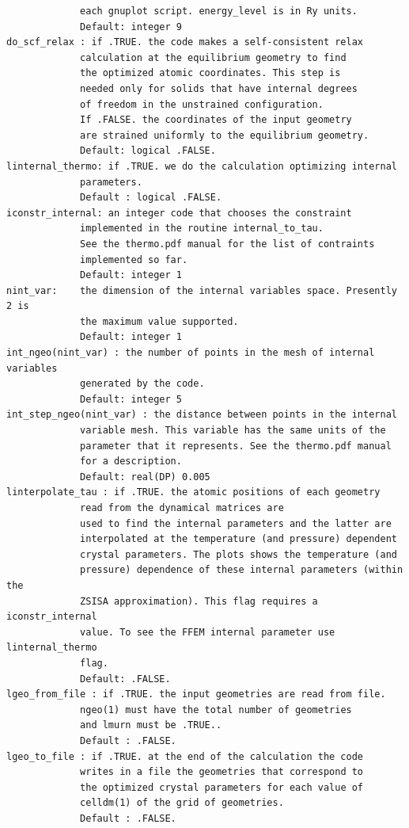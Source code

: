 \documentclass[12pt,a4paper,twoside]{report}
\begin{document}
\begin{verbatim}
             each gnuplot script. energy_level is in Ry units.
             Default: integer 9
do_scf_relax : if .TRUE. the code makes a self-consistent relax 
             calculation at the equilibrium geometry to find 
             the optimized atomic coordinates. This step is 
             needed only for solids that have internal degrees 
             of freedom in the unstrained configuration. 
             If .FALSE. the coordinates of the input geometry 
             are strained uniformly to the equilibrium geometry.
             Default: logical .FALSE. 
linternal_thermo: if .TRUE. we do the calculation optimizing internal
             parameters. 
             Default : logical .FALSE.
iconstr_internal: an integer code that chooses the constraint 
             implemented in the routine internal_to_tau.
             See the thermo.pdf manual for the list of contraints 
             implemented so far.
             Default: integer 1
nint_var:    the dimension of the internal variables space. Presently 2 is
             the maximum value supported.
             Default: integer 1
int_ngeo(nint_var) : the number of points in the mesh of internal variables
             generated by the code.
             Default: integer 5
int_step_ngeo(nint_var) : the distance between points in the internal
             variable mesh. This variable has the same units of the
             parameter that it represents. See the thermo.pdf manual
             for a description.
             Default: real(DP) 0.005
linterpolate_tau : if .TRUE. the atomic positions of each geometry
             read from the dynamical matrices are
             used to find the internal parameters and the latter are
             interpolated at the temperature (and pressure) dependent
             crystal parameters. The plots shows the temperature (and
             pressure) dependence of these internal parameters (within the
             ZSISA approximation). This flag requires a iconstr_internal
             value. To see the FFEM internal parameter use linternal_thermo
             flag.
             Default: .FALSE.
lgeo_from_file : if .TRUE. the input geometries are read from file.
             ngeo(1) must have the total number of geometries 
             and lmurn must be .TRUE..
             Default : .FALSE.
lgeo_to_file : if .TRUE. at the end of the calculation the code
             writes in a file the geometries that correspond to
             the optimized crystal parameters for each value of 
             celldm(1) of the grid of geometries.
             Default : .FALSE.

\end{verbatim}
\end{document}
